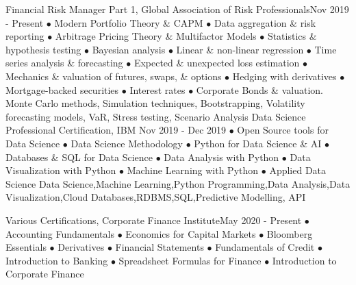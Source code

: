 \begin{prodevs}
\vspace{2ex}   
     \prodev 
    {Financial Risk Manager Part 1, Global Association of Risk Professionals}{Nov 2019 - Present}{}
    {$\bullet$ Modern Portfolio Theory \& CAPM
    $\bullet$ Data aggregation \& risk reporting  $\bullet$ Arbitrage Pricing Theory \& Multifactor Models 
    $\bullet$ Statistics \& hypothesis testing $\bullet$ Bayesian analysis $\bullet$ Linear \& non-linear regression
    $\bullet$ Time series analysis \& forecasting
    $\bullet$ Expected \& unexpected loss estimation  $\bullet$ Mechanics \& valuation of futures, swaps, \& options $\bullet$ Hedging with derivatives
    $\bullet$ Mortgage-backed securities
    $\bullet$ Interest rates $\bullet$ Corporate Bonds \& valuation.}
    {Monte Carlo methods, Simulation techniques, Bootstrapping, Volatility forecasting models, VaR, Stress testing, Scenario Analysis}
\vspace{2ex}   
    \prodev 
    {Data Science Professional Certification, IBM }{Nov 2019 - Dec 2019}
    {}
    {$\bullet$ Open Source tools for Data Science $\bullet$ Data Science Methodology $\bullet$ Python for Data Science \& AI $\bullet$ Databases \& SQL for Data Science $\bullet$ Data Analysis with Python $\bullet$ Data Visualization with Python $\bullet$ Machine Learning with Python $\bullet$ Applied Data Science}
    {Data Science,Machine Learning,Python Programming,Data Analysis,Data Visualization,Cloud Databases,RDBMS,SQL,Predictive Modelling, API}
   

\prodev 
  {Various Certifications, Corporate Finance Institute}{May 2020 - Present}
  {}
   {$\bullet$ Accounting Fundamentals  $\bullet$  Economics for Capital Markets $\bullet$ Bloomberg Essentials  $\bullet$  Derivatives
  $\bullet$ Financial Statements
  $\bullet$ Fundamentals of Credit $\bullet$ Introduction to Banking
    $\bullet$ Spreadsheet Formulas for Finance  $\bullet$ Introduction to Corporate Finance}{}
\end{prodevs}

    